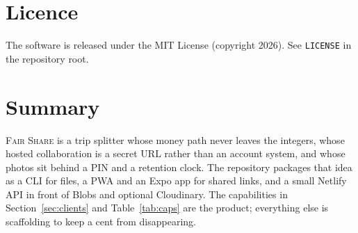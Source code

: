 \documentclass[11pt,a4paper]{article}
\newcommand{\fs}{\textsc{Fair Share}}
\newcommand{\code}[1]{\texttt{#1}}
\begin{document}
\section{Licence}

The software is released under the MIT License (copyright 2026).
See \code{LICENSE} in the repository root.

\section{Summary}

\fs{} is a trip splitter whose money path never leaves the integers, whose hosted collaboration is a secret URL rather than an account system, and whose photos sit behind a PIN and a retention clock.
The repository packages that idea as a CLI for files, a PWA and an Expo app for shared links, and a small Netlify API in front of Blobs and optional Cloudinary.
The capabilities in Section~\ref{sec:clients} and Table~\ref{tab:caps} are the product; everything else is scaffolding to keep a cent from disappearing.
\end{document}
